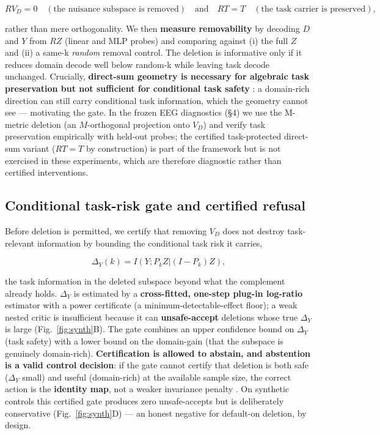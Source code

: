 \begin{equation}
R V_D = 0 \quad (\text{the nuisance subspace is removed}) \quad \text{and} \quad R T = T \quad (\text{the task carrier is preserved}),
\end{equation}

rather than mere orthogonality. We then \textbf{measure removability} by decoding $D$ and $Y$ from $RZ$ (linear and
MLP probes) and comparing against (i) the full $Z$ and (ii) a same-k \emph{random} removal control. The deletion
is informative only if it reduces domain decode well below random-k while leaving task decode unchanged.
Crucially, \textbf{direct-sum geometry is necessary for algebraic task preservation but not sufficient for
conditional task safety} : a domain-rich direction can still carry conditional task information, which
the geometry cannot see --- motivating the gate. In the frozen EEG diagnostics (\S4) we use the M-metric
deletion (an $M$-orthogonal projection onto $V_D$) and verify task preservation empirically with held-out
probes; the certified task-protected direct-sum variant ($RT{=}T$ by construction) is part of the framework
but is not exercised in these experiments, which are therefore diagnostic rather than certified interventions.

\subsection{Conditional task-risk gate and certified refusal}
Before deletion is permitted, we certify that removing $V_D$ does not destroy task-relevant information by
bounding the conditional task risk it carries,

\begin{equation}
\Delta_Y(k) = I(Y; P_k Z | (I - P_k) Z),
\end{equation}

the task information in the deleted subspace beyond what the complement already holds. $\Delta_Y$ is estimated by a
\textbf{cross-fitted, one-step plug-in log-ratio} estimator with a power certificate (a minimum-detectable-effect
floor); a weak nested critic is insufficient because it can \textbf{unsafe-accept} deletions whose true $\Delta_Y$ is
large (Fig.~\ref{fig:synth}B). The gate combines an upper confidence bound on $\Delta_Y$ (task safety) with a lower bound on the
domain-gain (that the subspace is genuinely domain-rich). \textbf{Certification is allowed to abstain, and
abstention is a valid control decision}: if the gate cannot certify that deletion is both safe ($\Delta_Y$ small)
and useful (domain-rich) at the available sample size, the correct action is the \textbf{identity map}, not a
weaker invariance penalty . On synthetic controls this certified gate produces zero unsafe-accepts but
is deliberately conservative (Fig.~\ref{fig:synth}D) --- an honest negative for default-on deletion, by design.


